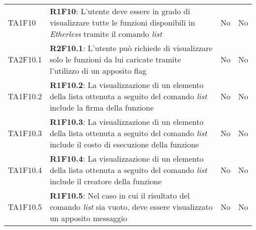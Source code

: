 \begin{longtable}{ 
		>{\centering}p{} 
		>{}p{} 
		>{\centering}p{}
		>{\centering}p{} }
	TA1F10 & \textbf{R1F10}: L'utente deve essere in grado di visualizzare tutte le funzioni 
		disponibili in \textit{Etherless} tramite il comando \textit{list} 				& No & No \tabularnewline
	TA2F10.1 & \textbf{R2F10.1}: L'utente può richiede di visualizzare solo le funzioni da 
		lui caricate tramite l'utilizzo di un apposito flag 						& No & No \tabularnewline
	TA1F10.2 & \textbf{R1F10.2}: La visualizzazione di un elemento della lista ottenuta a seguito 
		del comando \textit{list} include la firma della funzione 							& No & No \tabularnewline
	TA1F10.3 & \textbf{R1F10.3}: La visualizzazione di un elemento della lista ottenuta a seguito 
		del comando \textit{list} include il costo di esecuzione della funzione 			& No & No \tabularnewline
	TA1F10.4 & \textbf{R1F10.4}: La visualizzazione di un elemento della lista ottenuta a seguito 
		del comando \textit{list} include il creatore della funzione 						& No & No \tabularnewline
	TA1F10.5 & \textbf{R1F10.5}: Nel caso in cui il risultato del comando \textit{list} sia vuoto, deve 
		essere visualizzato un apposito messaggio 									& No & No \tabularnewline
	

\end{longtable}
